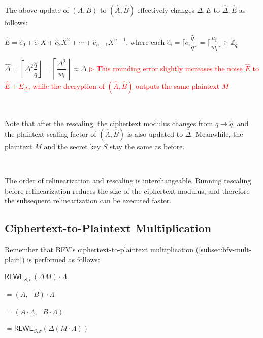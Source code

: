 \begin{tcolorbox}[title={\textbf{\tboxlabel{\ref*{subsubsec:ckks-mult-cipher-summary}} CKKS's Ciphertext-to-Ciphertext Multiplication}}]
\begin{enumerate}
$ $

The above update of $(A, B)$ to $(\hat{A}, \hat B)$ effectively changes $\Delta, E$ to $\hat\Delta, \hat E$ as follows:

$\hat{E} = \hat{e}_0 + \hat{e}_1X + \hat{e}_2X^2 + \cdots + \hat{e}_{n-1}X^{n-1}$, where each $\hat{e}_i = \Big\lceil e_i\dfrac{\hat{q}}{q} \Big\rfloor = \Big\lceil \dfrac{e_i}{w_l} \Big\rfloor \in \mathbb{Z}_{\hat{q}}$

$\hat{\Delta} = \left\lceil\Delta^2\dfrac{\hat{q}}{q}\right\rfloor = \left\lceil\dfrac{\Delta^2}{w_l}\right\rfloor \approx \Delta$ \textcolor{red}{ $\rhd$ This rounding error slightly increases the noise $\hat E$ to $\hat E + E_\Delta$, while the decryption of $(\hat A, \hat B)$ outputs the same plaintext $M$}

$ $


Note that after the rescaling, the ciphertext modulus changes from $q \rightarrow \hat q$, and the plaintext scaling factor of $(\hat A, \hat B)$ is also updated to $\hat{\Delta}$. Meanwhile, the plaintext $M$ and the secret key $S$ stay the same as before.

$ $

\end{enumerate}

 The order of relinearization and rescaling is interchangeable. Running rescaling before relinearization reduces the size of the ciphertext modulus, and therefore the subsequent relinearization can be executed faster. 

\end{tcolorbox}


\subsection{Ciphertext-to-Plaintext Multiplication}
\label{subsec:ckks-mult-plain}

Remember that BFV's ciphertext-to-plaintext multiplication (\autoref{subsec:bfv-mult-plain}) is performed as follows:

$\textsf{RLWE}_{S, \sigma}(\Delta M) \cdot \Lambda$

$= (A, \text{ } B) \cdot \Lambda$

$= (A \cdot \Lambda, \text{ }  B \cdot \Lambda )$

$= \textsf{RLWE}_{S, \sigma}(\Delta (M \cdot \Lambda) )$

